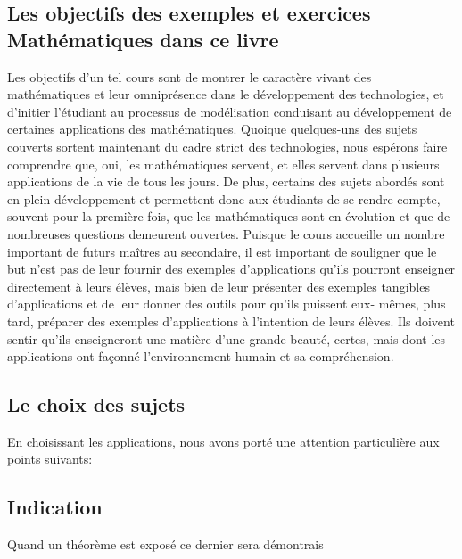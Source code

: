 \subsection*{Les objectifs des exemples et exercices Mathématiques dans ce livre}
Les objectifs d’un tel cours sont de montrer le caractère vivant des mathématiques
et leur omniprésence dans le développement des technologies, et d’initier l’étudiant au
processus de modélisation conduisant au développement de certaines applications des
mathématiques.
Quoique quelques-uns des sujets couverts sortent maintenant du cadre strict des
technologies, nous espérons faire comprendre que, oui, les mathématiques servent, et
elles servent dans plusieurs applications de la vie de tous les jours. De plus, certains
des sujets abordés sont en plein développement et permettent donc aux étudiants de se
rendre compte, souvent pour la première fois, que les mathématiques sont en évolution
et que de nombreuses questions demeurent ouvertes.
Puisque le cours accueille un nombre important de futurs maîtres au secondaire, il est
important de souligner que le but n’est pas de leur fournir des exemples d’applications
qu’ils pourront enseigner directement à leurs élèves, mais bien de leur présenter des
exemples tangibles d’applications et de leur donner des outils pour qu’ils puissent eux-
mêmes, plus tard, préparer des exemples d’applications à l’intention de leurs élèves. Ils
doivent sentir qu’ils enseigneront une matière d’une grande beauté, certes, mais dont
les applications ont façonné l’environnement humain et sa compréhension.
\subsection*{Le choix des sujets}
En choisissant les applications, nous avons porté une attention particulière aux points suivants:
\subsection*{Indication}
Quand un théorème est exposé ce dernier sera démontrais